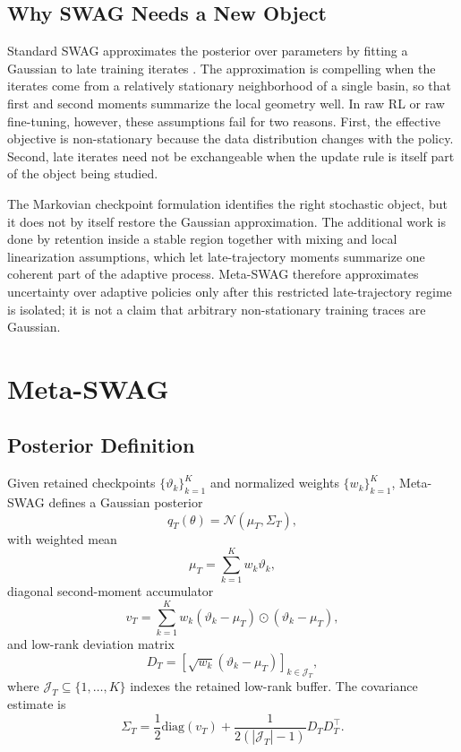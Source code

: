\documentclass[10pt]{article}
\theoremstyle{plain}
\theoremstyle{definition}
\theoremstyle{remark}
\newcommand{\diag}{\mathrm{diag}}
\begin{document}
\subsection{Why SWAG Needs a New Object}

Standard SWAG approximates the posterior over parameters by fitting a Gaussian to late training iterates \citep{maddox2019swag}. The approximation is compelling when the iterates come from a relatively stationary neighborhood of a single basin, so that first and second moments summarize the local geometry well. In raw RL or raw fine-tuning, however, these assumptions fail for two reasons. First, the effective objective is non-stationary because the data distribution changes with the policy. Second, late iterates need not be exchangeable when the update rule is itself part of the object being studied.

The Markovian checkpoint formulation identifies the right stochastic object, but it does not by itself restore the Gaussian approximation. The additional work is done by retention inside a stable region together with mixing and local linearization assumptions, which let late-trajectory moments summarize one coherent part of the adaptive process. Meta-SWAG therefore approximates uncertainty over adaptive policies only after this restricted late-trajectory regime is isolated; it is not a claim that arbitrary non-stationary training traces are Gaussian.

\section{Meta-SWAG}

\subsection{Posterior Definition}

Given retained checkpoints $\{\vartheta_k\}_{k=1}^K$ and normalized weights $\{w_k\}_{k=1}^K$, Meta-SWAG defines a Gaussian posterior
\begin{equation}
q_T(\theta)=\mathcal{N}(\mu_T,\Sigma_T),
\end{equation}
with weighted mean
\begin{equation}
\mu_T = \sum_{k=1}^K w_k \vartheta_k,
\end{equation}
diagonal second-moment accumulator
\begin{equation}
v_T = \sum_{k=1}^K w_k (\vartheta_k-\mu_T)\odot(\vartheta_k-\mu_T),
\end{equation}
and low-rank deviation matrix
\begin{equation}
D_T = \left[\sqrt{w_k}(\vartheta_k-\mu_T)\right]_{k \in \mathcal{J}_T},
\end{equation}
where $\mathcal{J}_T \subseteq \{1,\dots,K\}$ indexes the retained low-rank buffer. The covariance estimate is
\begin{equation}
\Sigma_T = \frac{1}{2}\diag(v_T) + \frac{1}{2(|\mathcal{J}_T|-1)}D_TD_T^\top.
\end{equation}
\end{document}
